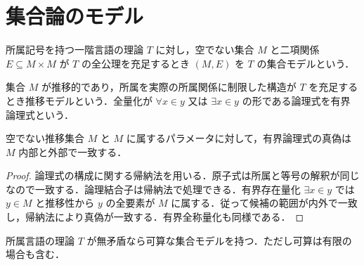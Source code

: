 \section{集合論のモデル}
\begin{defn}[集合論の集合モデル]
所属記号を持つ一階言語の理論 $T$ に対し，空でない集合 $M$ と二項関係 $E\subseteq M\times M$ が $T$ の全公理を充足するとき $(M,E)$ を $T$ の集合モデルという．
\end{defn}
\begin{defn}[推移モデルと有界論理式]
集合 $M$ が推移的であり，所属を実際の所属関係に制限した構造が $T$ を充足するとき推移モデルという．全量化が $\forall x\in y$ 又は $\exists x\in y$ の形である論理式を有界論理式という．
\end{defn}
\begin{prop}[有界論理式の絶対性]
空でない推移集合 $M$ と $M$ に属するパラメータに対して，有界論理式の真偽は $M$ 内部と外部で一致する．
\end{prop}
\begin{proof}
論理式の構成に関する帰納法を用いる．原子式は所属と等号の解釈が同じなので一致する．論理結合子は帰納法で処理できる．有界存在量化 $\exists x\in y$ では $y\in M$ と推移性から $y$ の全要素が $M$ に属する．従って候補の範囲が内外で一致し，帰納法により真偽が一致する．有界全称量化も同様である．
\end{proof}
\begin{prop}[可算モデルの存在]
所属言語の理論 $T$ が無矛盾なら可算な集合モデルを持つ．ただし可算は有限の場合も含む．
\end{prop}
